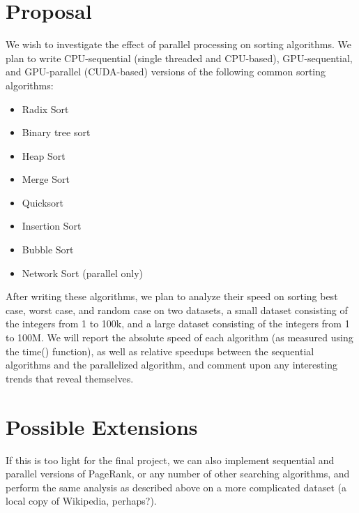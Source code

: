 \documentclass{article}
\begin{document}
\maketitle

\section{Proposal}

We wish to investigate the effect of parallel processing on sorting algorithms.  We plan to write CPU-sequential (single threaded and CPU-based), GPU-sequential, and GPU-parallel (CUDA-based) versions of the following common sorting algorithms:

\begin{itemize}
  \setlength{\itemsep}{0pt}
  \setlength{\parskip}{0pt}
  \item Radix Sort
  \item Binary tree sort
  \item Heap Sort
  \item Merge Sort
  \item Quicksort
  \item Insertion Sort
  \item Bubble Sort
  \item Network Sort (parallel only)
\end{itemize}

After writing these algorithms, we plan to analyze their speed on sorting best case, worst case, and random case on two datasets, a small dataset consisting of the integers from 1 to 100k, and a large dataset consisting of the integers from 1 to 100M.  We will report the absolute speed of each algorithm (as measured using the time() function), as well as relative speedups between the sequential algorithms and the parallelized algorithm, and comment upon any interesting trends that reveal themselves.

\section{Possible Extensions}

If this is too light for the final project, we can also implement sequential and parallel versions of PageRank, or any number of other searching algorithms, and perform the same analysis as described above on a more complicated dataset (a local copy of Wikipedia, perhaps?).
\end{document}
